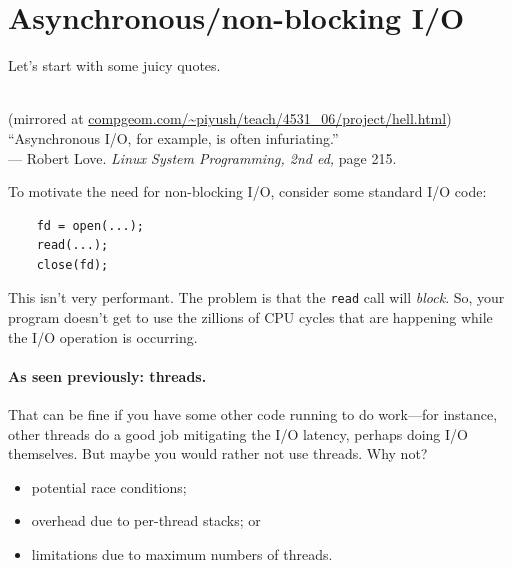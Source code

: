 \documentclass[11pt]{article}
\begin{document}
\section*{Asynchronous/non-blocking I/O}

Let's start with some juicy quotes.

\begin{center}
  \\
{\scriptsize (mirrored at \url{compgeom.com/~piyush/teach/4531_06/project/hell.html})}
   \\[2em]

   ``Asynchronous I/O, for example, is often infuriating.''\\
\hfill --- Robert Love. {\em Linux System Programming, 2nd ed, } page 215.

\end{center}

To motivate the need for non-blocking I/O, consider some standard I/O code:

\begin{lstlisting}
    fd = open(...);
    read(...);
    close(fd);
\end{lstlisting}

This isn't very performant. The problem is that the {\tt read} call will
{\em block}. So, your program doesn't get to use the zillions of CPU cycles that
are happening while the I/O operation is occurring.

\paragraph{As seen previously: threads.} That can be fine if
you have some other code running to do work---for instance, other threads
do a good job mitigating the I/O latency, perhaps doing I/O themselves.
But maybe you would rather not use threads. Why not?

\begin{itemize}
\item potential race conditions;
\item overhead due to per-thread stacks; or
\item limitations due to maximum numbers of threads.
\end{itemize}
\end{document}
